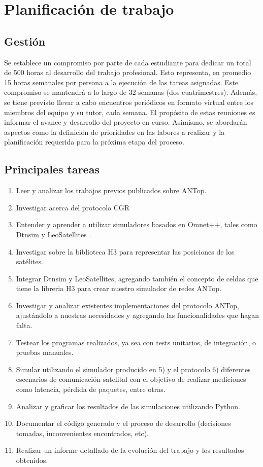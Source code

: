 \section{Planificación de trabajo}
\subsection{Gestión}

Se establece un compromiso por parte de cada estudiante para dedicar un total de 500 horas al desarrollo del trabajo profesional. Esto representa, en promedio 15 horas semanales por persona a la ejecución de las tareas asignadas. Este compromiso se mantendrá a lo largo de 32 semanas (dos cuatrimestres). Además, se tiene previsto llevar a cabo encuentros periódicos en formato virtual entre los miembros del equipo y su tutor, cada semana. El propósito de estas reuniones es informar el avance y desarrollo del proyecto en curso. 
Asimismo, se abordarán aspectos como la definición de prioridades en las labores a realizar y la planificación requerida para la próxima etapa del proceso. 

\subsection{Principales tareas}
\begin{enumerate}
    \item Leer y analizar los trabajos previos publicados sobre ANTop.
    \item Investigar acerca del protocolo CGR
    \item Entender y aprender a utilizar simuladores basados en Omnet++, tales como Dtnsim \cite{DtnSim} y LeoSatellites \cite{omnetpp-leosatellites-model}.
    \item Investigar sobre la biblioteca H3 \cite{h3} para representar las posiciones de los satélites.
    \item Integrar Dtnsim y LeoSatellites, agregando también el concepto de celdas
que tiene la libreria H3 para crear nuestro simulador de redes ANTop.
    \item Investigar y analizar existentes implementaciones del protocolo ANTop, ajustándolo a nuestras necesidades y agregando las funcionalidades que hagan falta.
    \item Testear los programas realizados, ya sea con tests unitarios, de integración, o pruebas manuales.
    \item Simular utilizando el simulador producido en 5) y el protocolo 6) diferentes escenarios de comunicación satelital con el objetivo de realizar mediciones como latencia, pérdida de paquetes, entre otras.
    \item Analizar y graficar los resultados de las simulaciones utilizando Python.
    \item Documentar el código generado y el proceso de desarrollo (decisiones tomadas, inconvenientes encontrados, etc).
    \item Realizar un informe detallado de la evolución del trabajo y los resultados obtenidos.
\end{enumerate}

